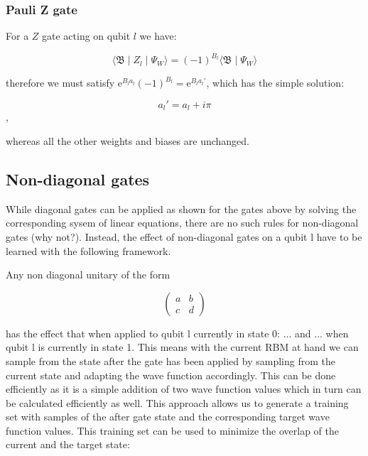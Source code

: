 \subsubsection{Pauli Z gate}
For a $Z$ gate acting on qubit $l$ we have:

\begin{equation}
    \langle \mathfrak{B} \mid Z_{l} \mid \Psi_{W}  \rangle = 
    (-1)^{B_{l}} \langle \mathfrak{B} \mid \Psi_{W} \rangle
\end{equation}

therefore we must satisfy $\mathrm{e}^{B_{l}a_{l}}(-1)^{B_{l}} = \mathrm{e}^{B_{l}a_{l}\prime}$, which
has the simple solution:

\begin{equation}
    a_{l}\prime = a_{l} + i \pi
\end{equation},

whereas all the other weights and biases are unchanged.

\subsection{Non-diagonal gates}
While diagonal gates can be applied as shown for the gates above by solving the corresponding sysem of linear equations, 
there are no such rules for non-diagonal gates (why not?). Instead, the effect of non-diagonal gates on a qubit l have to be 
learned with the following framework.

Any non diagonal unitary of the form 

\begin{equation}
    \begin{pmatrix}
        a & b \\
        c & d
    \end{pmatrix}
\end{equation}

has the effect that when applied to qubit l currently in state 0: ... and ... when qubit l is currently in state 1. This means 
with the current RBM at hand we can sample from the state after the gate has been applied by sampling from the current state 
and adapting the wave function accordingly. This can be done efficiently as it is a simple addition of two wave function values 
which in turn can be calculated efficiently as well. This approach allows us to generate a training set with samples of the 
after gate state and the corresponding target wave function values. This training set can be used to minimize the overlap of
the current and the target state:

